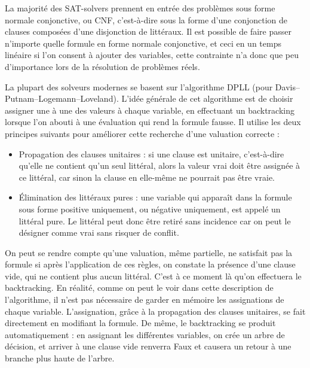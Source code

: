 \documentclass[a4paper,11pt]{article}
\begin{document}
La majorité des SAT-solvers prennent en entrée des problèmes sous forme normale conjonctive, ou CNF, c'est-à-dire sous la forme d'une conjonction de clauses composées d'une disjonction de littéraux. 
Il est possible de faire passer n’importe quelle formule en forme normale conjonctive, et ceci en un temps linéaire si l'on consent à ajouter des variables, cette contrainte n'a donc que peu d'importance lors 
de la résolution de problèmes réels.

La plupart des solveurs modernes se basent sur l'algorithme DPLL (pour Davis–Putnam–Logemann–Loveland). L'idée générale de cet algorithme est de choisir assigner une à une des valeurs à chaque variable, en 
effectuant un backtracking lorsque l'on abouti à une évaluation qui rend la formule fausse. Il utilise les deux principes suivants pour améliorer cette recherche d'une valuation correcte :

\begin{itemize}
	\item Propagation des clauses unitaires : si une clause est unitaire, c'est-à-dire qu'elle ne contient qu'un seul littéral, alors la valeur vrai doit être assignée à ce littéral, car sinon la clause en 
	elle-même ne pourrait pas être vraie.
	\item Élimination des littéraux pures : une variable qui apparaît dans la formule sous forme positive uniquement, ou négative uniquement, est appelé un littéral pure. Le littéral peut donc être retiré sans incidence 
	car on peut le désigner comme vrai sans risquer de conflit.
\end{itemize}

On peut se rendre compte qu'une valuation, même partielle, ne satisfait pas la formule si après l'application de ces règles, on constate la présence d'une clause vide, qui ne contient plus aucun littéral. C'est 
à ce moment là qu'on effectuera le backtracking. En réalité, comme on peut le voir dans cette description de l'algorithme, il n'est pas nécessaire de garder en mémoire les assignations de chaque variable. 
L'assignation, grâce à la propagation des clauses unitaires, se fait directement en modifiant la formule. De même, le backtracking se produit automatiquement : en assignant les différentes variables, on crée un 
arbre de décision, et arriver à une clause vide renverra Faux et causera un retour à une branche plus haute de l'arbre.

\end{document}
